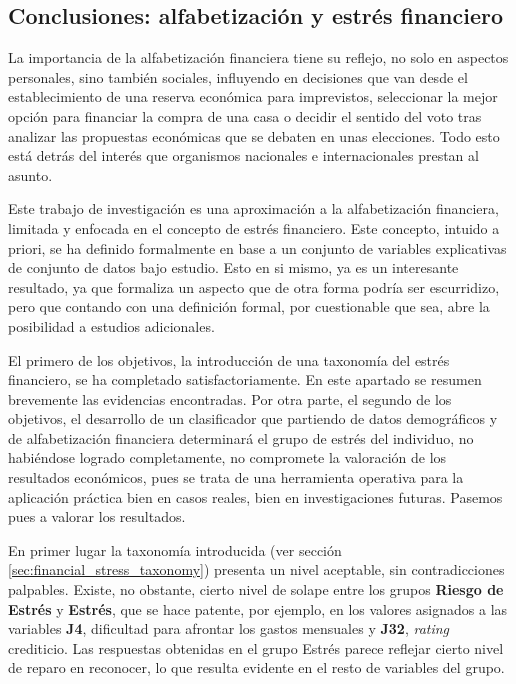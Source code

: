 \documentclass[a4paper, 11pt]{article}
\begin{document}
\subsection{Conclusiones: alfabetización y estrés financiero}
\label{sec:sub:conclusions_financial_stress}
La importancia de la alfabetización financiera tiene su reflejo, no solo en 
aspectos personales, sino también sociales, influyendo en decisiones que van desde
el establecimiento de una reserva económica para imprevistos, seleccionar la mejor
opción para financiar la compra de una casa o decidir el sentido del voto tras 
analizar las propuestas económicas que se debaten en unas elecciones. 
Todo esto está detrás del interés que organismos nacionales e internacionales 
prestan al asunto. 

Este trabajo de investigación es una aproximación a la alfabetización financiera,
limitada y enfocada en el concepto de estrés financiero. Este concepto, intuido 
a priori, se ha definido formalmente en base a un conjunto de variables explicativas
de conjunto de datos bajo estudio. Esto en si mismo, ya es un interesante resultado, 
ya que formaliza un aspecto que de otra forma podría ser escurridizo, pero que 
contando con una definición formal, por cuestionable que sea, abre la posibilidad 
a estudios adicionales.

El primero de los objetivos, la introducción de una taxonomía del estrés financiero, se
ha completado satisfactoriamente. En este apartado se resumen brevemente las evidencias
encontradas. Por otra parte, el segundo de los objetivos, el desarrollo de un clasificador
que partiendo de datos demográficos y de alfabetización financiera determinará el grupo
de estrés del individuo, no habiéndose logrado completamente, no compromete la valoración
de los resultados económicos, pues se trata de una herramienta operativa para la aplicación
práctica bien en casos reales, bien en investigaciones futuras. Pasemos pues a valorar 
los resultados.

En primer lugar la taxonomía introducida (ver sección \ref{sec:financial_stress_taxonomy})
presenta un nivel aceptable, sin contradicciones palpables. Existe, no obstante, cierto nivel
de solape entre los grupos \textbf{Riesgo de Estrés} y \textbf{Estrés}, que se hace patente,
por ejemplo, en los valores asignados a las variables \textbf{J4}, dificultad para afrontar
los gastos mensuales y \textbf{J32}, \textit{rating} crediticio. Las respuestas obtenidas
en el grupo Estrés parece reflejar cierto nivel de reparo en reconocer, lo que resulta
evidente en el resto de variables del grupo.
\end{document}
